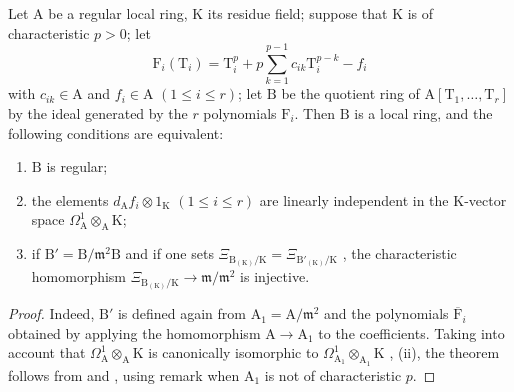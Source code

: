 \begin{theorem}[22.5.4]
\label{0.22.5.4}
Let $\mathrm{A}$ be a regular local ring, $\mathrm{K}$ its residue field; suppose that $\mathrm{K}$ is of characteristic $p>0$; let
\[
\label{0.22.5.4.1}
  \mathrm{F}_i(\mathrm{T}_i)=\mathrm{T}_i^p+p\sum_{k=1}^{p-1}c_{ik}\mathrm{T}_i^{p-k}-f_i
  \tag{22.5.4.1}
\]
with $c_{ik}\in\mathrm{A}$ and $f_i\in\mathrm{A}$ $(1\leq i\leq r)$; let $\mathrm{B}$ be the quotient ring of $\mathrm{A}[\mathrm{T}_1,\ldots,\mathrm{T}_r]$ by the ideal generated by the $r$ polynomials $\mathrm{F}_i$.
Then $\mathrm{B}$ is a local ring, and the following conditions are equivalent:
\begin{enumerate}
  \item[a)] $\mathrm{B}$ is regular;
  \item[b)] the elements $d_\mathrm{A}f_i\otimes 1_\mathrm{K}$ $(1\leq i\leq r)$ are linearly independent in the $\mathrm{K}$-vector space $\Omega^1_\mathrm{A}\otimes_\mathrm{A}\mathrm{K}$;
  \item[c)] if $\mathrm{B}'=\mathrm{B}/\mathfrak{m}^2\mathrm{B}$ and if one sets $\Xi_{\mathrm{B}_{(\mathrm{K})}/\mathrm{K}}=\Xi_{\mathrm{B}'_{(\mathrm{K})}/\mathrm{K}}$ , the characteristic homomorphism $\Xi_{\mathrm{B}_{(\mathrm{K})}/\mathrm{K}}\to\mathfrak{m}/\mathfrak{m}^2$  is injective.
\end{enumerate}
\end{theorem}

\begin{proof}
Indeed, $\mathrm{B}'$ is defined again from $\mathrm{A}_1=\mathrm{A}/\mathfrak{m}^2$ and the polynomials $\overline{\mathrm{F}}_i$ obtained by applying the homomorphism $\mathrm{A}\to\mathrm{A}_1$ to the coefficients.
Taking into account that $\Omega^1_\mathrm{A}\otimes_\mathrm{A}\mathrm{K}$ is canonically isomorphic to $\Omega^1_{\mathrm{A}_1}\otimes_{\mathrm{A}_1}\mathrm{K}$ , (ii), the theorem follows from  and , using remark  when $\mathrm{A}_1$ is not of characteristic $p$.
\end{proof}

